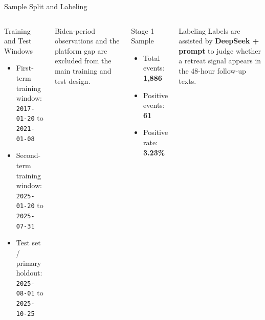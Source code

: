 \begin{frame}{Sample Split and Labeling}
  \begin{columns}[T,onlytextwidth]
      \begin{block}{Training and Test Windows}
        \begin{itemize}
          \item First-term training window: \texttt{2017-01-20} to \texttt{2021-01-08}
          \item Second-term training window: \texttt{2025-01-20} to \texttt{2025-07-31}
          \item Test set / primary holdout: \texttt{2025-08-01} to \texttt{2025-10-25}
        \end{itemize}
      \end{block}

      \small
      Biden-period observations and the platform gap are excluded from the main training and test design.

      \begin{block}{Stage 1 Sample}
        \begin{itemize}
          \item Total events: \textbf{1,886}
          \item Positive events: \textbf{61}
          \item Positive rate: \textbf{3.23\%}
        \end{itemize}
      \end{block}

      \begin{block}{Labeling}
        \small
        Labels are assisted by \textbf{DeepSeek + prompt} to judge whether a retreat signal appears in the 48-hour follow-up texts.
      \end{block}
  \end{columns}
\end{frame}
